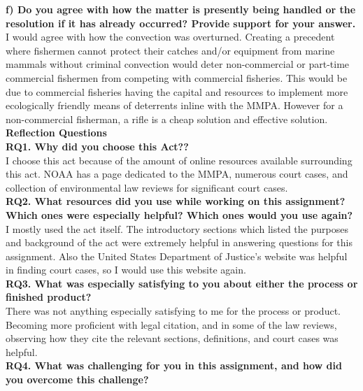 \documentclass[12pt]{article}
\begin{document}
\textbf{f) Do you agree with how the matter is presently being handled or the resolution if it has already occurred?  Provide support for your answer.} \\

I would agree with how the convection was overturned. Creating a precedent where fishermen cannot protect their catches and/or equipment from marine mammals without criminal convection would deter non-commercial or part-time commercial fishermen from competing with commercial fisheries. This would be due to commercial fisheries having the capital and resources to implement more ecologically friendly means of deterrents inline with the MMPA. However for a non-commercial fisherman, a rifle is a cheap solution and effective solution. \\

\textbf{Reflection Questions} \\

\textbf{RQ1. Why did you choose this Act?? } \\

I choose this act because of the amount of online resources available surrounding this act. NOAA has a page dedicated to the MMPA, numerous court cases, and collection of environmental law reviews for significant court cases. \\

\textbf{RQ2. What resources did you use while working on this assignment? Which ones were especially helpful?  Which ones would you use again?} \\

I mostly used the act itself. The introductory sections which listed the purposes and background of the act were extremely helpful in answering questions for this assignment. Also the United States Department of Justice's website was helpful in finding court cases, so I would use this website again. \\

\textbf{RQ3. What was especially satisfying to you about either the process or finished product?} \\

There was not anything especially satisfying to me for the process or product. Becoming more proficient with legal citation, and in some of the law reviews, observing how they cite the relevant sections, definitions, and court cases was helpful. \\

\textbf{RQ4. What was challenging for you in this assignment, and how did you overcome this challenge?} \\
\end{document}
